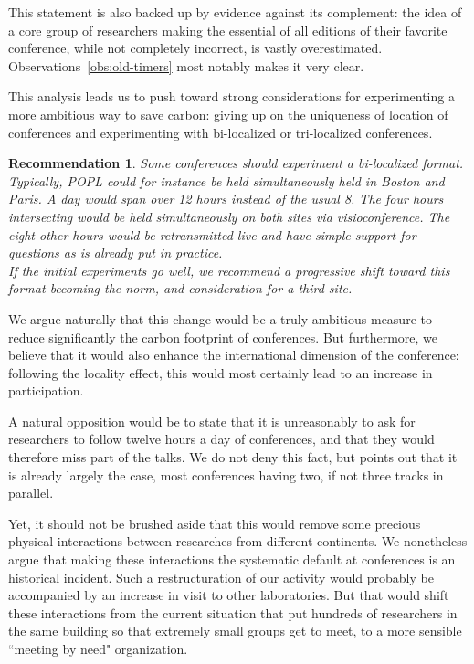 \documentclass{scrartcl}
\newtheorem{recommend}{Recommendation}
\begin{document}
This statement is also backed up by evidence against its complement: the idea of a core
group of researchers making the essential of all editions of their favorite conference,
while not completely incorrect, is vastly overestimated. Observations~\ref{obs:old-timers}
most notably makes it very clear.

This analysis leads us to push toward strong considerations for experimenting a more
ambitious way to save carbon: giving up on the uniqueness of location of conferences and
experimenting with bi-localized or tri-localized conferences.

\begin{recommend}
  Some conferences should experiment a bi-localized format. Typically, POPL could for
  instance be held simultaneously held in Boston and Paris. A day would span over 12 hours
  instead of the usual 8. The four hours intersecting would be held simultaneously on
  both sites via visioconference. The eight other hours would be retransmitted live and
  have simple support for questions as is already put in practice.\\
  If the initial experiments go well, we recommend a progressive shift toward this
  format becoming the norm, and consideration for a third site.
\end{recommend}

We argue naturally that this change would be a truly ambitious measure to reduce
significantly the carbon footprint of conferences. But furthermore, we believe that
it would also enhance the international dimension of the conference: following
the locality effect, this would most certainly lead to an increase in participation.

A natural opposition would be to state that it is unreasonably to ask for researchers to
follow twelve hours a day of conferences, and that they would therefore miss part of the
talks. We do not deny this fact, but points out that it is already largely the case,
most conferences having two, if not three tracks in parallel.

Yet, it should not be brushed aside that this would remove some precious
physical interactions between researches from different continents. We
nonetheless argue that making these interactions the systematic default at conferences
is an historical incident. Such a restructuration of our activity would probably
be accompanied by an increase in visit to other laboratories. But that would shift
these interactions from the current situation that put hundreds of researchers in the
same building so that extremely small groups get to meet, to a more sensible ``meeting
by need" organization.
\end{document}
